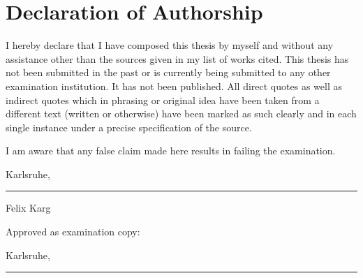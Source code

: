\chapter*{Declaration of Authorship}

I hereby declare that I have composed this thesis by myself and without any
assistance other than the sources given in my list of works cited. This thesis
has not been submitted in the past or is currently being submitted to any other
examination institution. It has not been published. All direct quotes as well
as indirect quotes which in phrasing or original idea have been taken from a
different text (written or otherwise) have been marked as such clearly and in
each single instance under a precise specification of the source.

I am aware that any false claim made here results in failing the examination.

\vspace{1cm}

\noindent Karlsruhe, \longdate \hfill \parbox[t]{.5\linewidth}{\rule[-3pt]{\linewidth}{.4pt}\par\smallskip
    \centering Felix Karg}

\vfill

Approved as examination copy:\\

\vspace{1cm}

\noindent Karlsruhe, \longdate \hfill \parbox[t]{.5\linewidth}{\rule[-3pt]{\linewidth}{.4pt}\par\smallskip
    \centering}

\renewcommand{\arraystretch}{1}

\cleardoublepage

\renewcommand{\cftchapfont}{%
    \bfseries
}

\tableofcontents                    %
\begingroup \let\clearpage\relax    %
\endgroup
\cleardoublepage

\MainMatter

